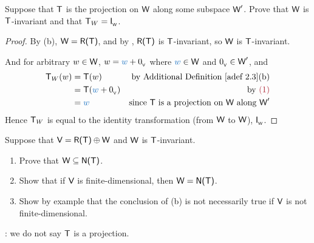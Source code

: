 \begin{exercise} \label{exercise 2.1.31}
Suppose that \(\textsf{T}\) is the projection on \(\textsf{W}\) along some subspace \(\textsf{W}'\).
Prove that \(\textsf{W}\) is \(\textsf{T}\)-invariant and that \(\textsf{T}_W = \textsf{I}_{_{\textsf{W}}}\).
\end{exercise}

\begin{proof}
By (b), \(\textsf{W} = \textsf{R(T)}\), and by , \(\textsf{R(T)}\) is \(\textsf{T}\)-invariant, so \(\textsf{W}\) is \(\textsf{T}\)-invariant.

And for arbitrary \(w \in \textsf{W}\), \(w = \BLUE{w} + \OV\)  where \(\BLUE{w} \in \W\) and \(0_{_{\textsf{V}}} \in \textsf{W}'\), and
\begin{align*}
    \T_W(w) & = \T(w) & \text{by \ADEF{2.3}(b)} \\
            & = \T(\BLUE{w} + \OV) & \text{by \MAROON{(1)}} \\
            & = \BLUE{w} & \text{since \(\T\) is a projection on \(\W\) along \(\W'\)}
\end{align*}
Hence \(\textsf{T}_W\) is equal to the identity transformation (from \(\textsf{W}\) to \(\textsf{W}\)), \(\textsf{I}_{_{\textsf{W}}}\).
\end{proof}

\begin{exercise} \label{exercise 2.1.32}
Suppose that \(\textsf{V} = \textsf{R(T)} \oplus \textsf{W}\) and \(\textsf{W}\) is \(\textsf{T}\)-invariant.
\begin{enumerate}
\item Prove that \(\textsf{W} \subseteq \textsf{N(T)}\).
\item Show that if \(\textsf{V}\) is finite-dimensional, then \(\textsf{W} = \textsf{N(T)}\).
\item Show by example that the conclusion of (b) is not necessarily true if \(\textsf{V}\) is not finite-dimensional.
\end{enumerate}

: we do not say \(\textsf{T}\) is a projection.
\end{exercise}

